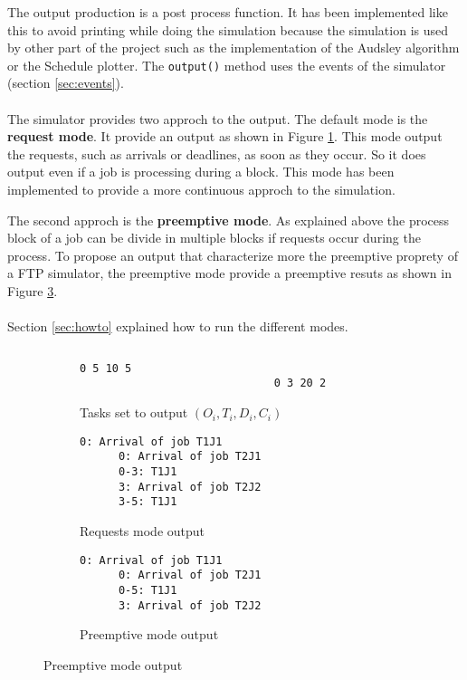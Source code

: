 \documentclass[letterpaper]{article}
\begin{document}
The output production is a post process function. It has been implemented
like this to avoid printing while doing the simulation because the simulation
is used by other part of the project such as the implementation of the
Audsley algorithm or the Schedule plotter. The \texttt{output()} method
uses the events of the simulator (section \ref{sec:events}).


\paragraph{}
The simulator provides two approch to the output. The default
mode is the \textbf{request mode}. It provide an output as shown in Figure
\ref{fig:req_mode}. This mode output the requests,
such as arrivals or deadlines, as soon as they occur. So it does output
even if a job is processing during a block.
This mode has been implemented
to provide a more continuous approch to the simulation.

The second approch is the \textbf{preemptive mode}. As explained above
the process block of a job can be divide in multiple blocks if requests
occur during the process. To propose an output that characterize more
the preemptive proprety of a FTP simulator, the preemptive mode provide
a preemptive resuts as shown in Figure \ref{fig:pre_mode}.

\paragraph{}
Section \ref{sec:howto} explained how to run the different modes.




\begin{figure}[H]
  \begin{subfigure}{1\textwidth}
    \begin{lstlisting}
    \end{lstlisting}
      \centering
      \begin{lstlisting}[numbers=none]
                              0 5 10 5
                              0 3 20 2
      \end{lstlisting}
      \caption{Tasks set to output $(O_i, T_i, D_i, C_i)$}
  \end{subfigure}
  \begin{subfigure}{.5\textwidth}
      \centering
      \begin{lstlisting}[numbers=none]
      0: Arrival of job T1J1
      0: Arrival of job T2J1
      0-3: T1J1
      3: Arrival of job T2J2
      3-5: T1J1
      \end{lstlisting}
      \caption{Requests mode output}
      \label{fig:req_mode}
  \end{subfigure}
  \begin{subfigure}{.5\textwidth}
      \centering
      \begin{lstlisting}[numbers=none]
      0: Arrival of job T1J1
      0: Arrival of job T2J1
      0-5: T1J1
      3: Arrival of job T2J2
      \end{lstlisting}
      \caption{Preemptive mode output}
      \label{fig:pre_mode}
  \end{subfigure}
\end{figure}
\end{document}
